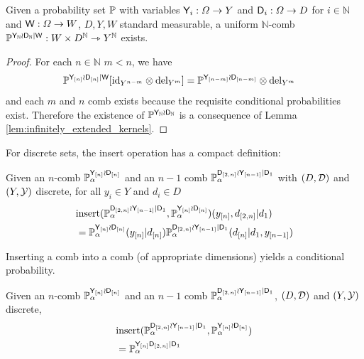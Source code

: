 \begin{theorem}
Given a probability set $\mathbb{P}$ with variables $\mathsf{Y}_i:\Omega\to Y$ and $\mathsf{D}_i:\Omega\to D$ for $i\in \mathbb{N}$ and $\mathsf{W}:\Omega\to W$, $D,Y,W$ standard measurable, a uniform $\mathbb{N}$-comb $\mathbb{P}^{\mathsf{Y}_{\mathbb{N}}\wr \mathsf{D}_{\mathbb{N}}|\mathsf{W}}:W\times D^\mathbb{N}\rightarrowtriangle Y^\mathbb{N}$ exists.
\end{theorem}

\begin{proof}
For each $n\in \mathbb{N}$ $m<n$, we have
\begin{align}
    \mathbb{P}^{\mathsf{Y}_{[n]}\wr \mathsf{D}_{[n]}|\mathsf{W}}[\mathrm{id}_{Y^{n-m}}\otimes \mathrm{del}_{Y^m}] &= \mathbb{P}^{\mathsf{Y}_{[n-m]}\wr \mathsf{D}_{[n-m]}}\otimes \mathrm{del}_{Y^m}
\end{align}
and each $m$ and $n$ comb exists because the requisite conditional probabilities exist. Therefore the existence of $\mathbb{P}^{\mathsf{Y}_{\mathbb{N}}\wr \mathsf{D}_{\mathbb{N}}}$ is a consequence of Lemma \ref{lem:infinitely_extended_kernels}.
\end{proof}

For discrete sets, the insert operation has a compact definition:

\begin{definition}\label{def:insert_discrete}
Given an $n$-comb $\mathbb{P}_\alpha^{\mathsf{Y}_{[n]}\wr \mathsf{D}_{[n]}}$ and an $n-1$ comb $\mathbb{P}_\alpha^{\mathsf{D}_{[2,n]}\wr \mathsf{Y}_{[n-1]}|\mathsf{D}_1}$ with $(D,\mathcal{D})$ and $(Y,\mathcal{Y})$ discrete, for all $y_i\in Y$ and $d_i\in D$
\begin{align}
    &\mathrm{insert}(\mathbb{P}_\alpha^{\mathsf{D}_{[2,n]}\wr \mathsf{Y}_{[n-1]}|\mathsf{D}_1},\mathbb{P}_\alpha^{\mathsf{Y}_{[n]}\wr \mathsf{D}_{[n]}})(y_{[n]},d_{[2,n]}|d_1)\\
     &= \mathbb{P}_\alpha^{\mathsf{Y}_{[n]}\wr \mathsf{D}_{[n]}}(y_{[n]}|d_{[n]})\mathbb{P}_\alpha^{\mathsf{D}_{[2,n]}\wr \mathsf{Y}_{[n-1]}|\mathsf{D}_1}(d_{[n]}|d_1,y_{[n-1]})
\end{align}
\end{definition}

Inserting a comb into a comb (of appropriate dimensions) yields a conditional probability.

\begin{theorem}
Given an $n$-comb $\mathbb{P}_\alpha^{\mathsf{Y}_{[n]}\wr \mathsf{D}_{[n]}}$ and an $n-1$ comb $\mathbb{P}_\alpha^{\mathsf{D}_{[2,n]}\wr \mathsf{Y}_{[n-1]}|\mathsf{D}_1}$, $(D,\mathcal{D})$ and $(Y,\mathcal{Y})$ discrete,
\begin{align}
    &\mathrm{insert}(\mathbb{P}_\alpha^{\mathsf{D}_{[2,n]}\wr \mathsf{Y}_{[n-1]}|\mathsf{D}_1},\mathbb{P}_\alpha^{\mathsf{Y}_{[n]}\wr \mathsf{D}_{[n]}})\\
     &= \mathbb{P}_\alpha^{\mathsf{Y}_{[n]}\mathsf{D}_{[2,n]}|\mathsf{D}_1}
\end{align}
\end{theorem}

